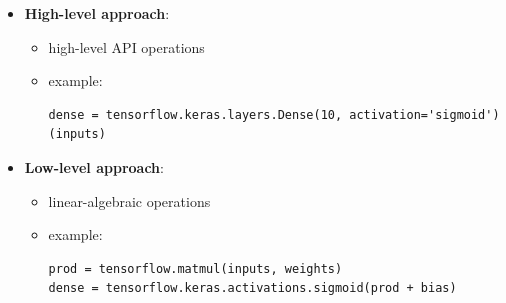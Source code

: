 \documentclass[11pt]{article}
\makeatletter
\newcommand{\boxspacing}{\kern\kvtcb@left@rule\kern\kvtcb@boxsep}
\newcommand{\prompt}[4]{
        \ttfamily\llap{{\color{#2}[#3]:\hspace{3pt}#4}}\vspace{-\baselineskip}
    }
\makeatother
\begin{document}
\begin{itemize}
\item
  \textbf{High-level approach}:

  \begin{itemize}
  \item
    high-level API operations
  \item
    example:

\begin{verbatim}
dense = tensorflow.keras.layers.Dense(10, activation='sigmoid')(inputs)
\end{verbatim}
  \end{itemize}
\item
  \textbf{Low-level approach}:

  \begin{itemize}
  \item
    linear-algebraic operations
  \item
    example:

\begin{verbatim}
prod = tensorflow.matmul(inputs, weights)
dense = tensorflow.keras.activations.sigmoid(prod + bias)
\end{verbatim}
  \end{itemize}
\end{itemize}

    \begin{tcolorbox}[breakable, size=fbox, boxrule=1pt, pad at break*=1mm,colback=cellbackground, colframe=cellborder]
\prompt{In}{incolor}{ }{\boxspacing}
\begin{Verbatim}[commandchars=\\\{\}]

\end{Verbatim}
\end{tcolorbox}

    \begin{tcolorbox}[breakable, size=fbox, boxrule=1pt, pad at break*=1mm,colback=cellbackground, colframe=cellborder]
\prompt{In}{incolor}{ }{\boxspacing}
\begin{Verbatim}[commandchars=\\\{\}]

\end{Verbatim}
\end{tcolorbox}

    \begin{tcolorbox}[breakable, size=fbox, boxrule=1pt, pad at break*=1mm,colback=cellbackground, colframe=cellborder]
\prompt{In}{incolor}{ }{\boxspacing}
\begin{Verbatim}[commandchars=\\\{\}]

\end{Verbatim}
\end{tcolorbox}
\end{document}
